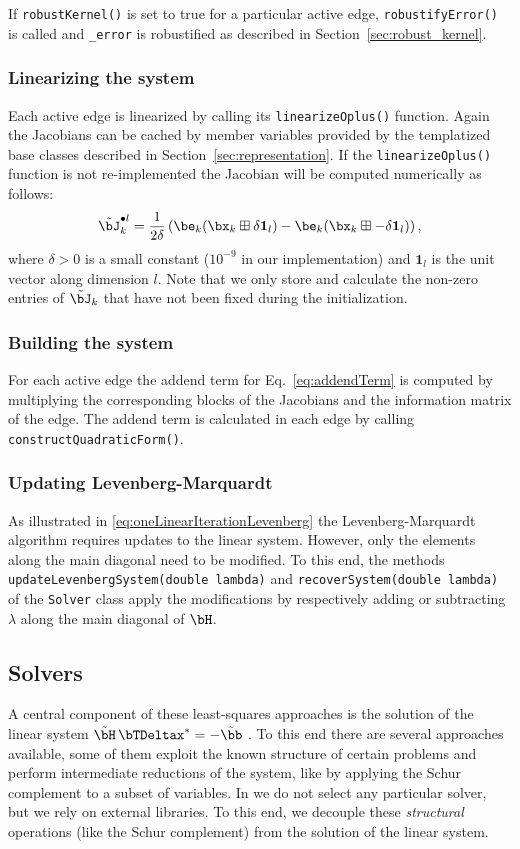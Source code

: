 \documentclass[a4paper]{article}
\begin{document}
 If \verb+robustKernel()+ is set to true for a particular active edge,
\verb+robustifyError()+ is called and \verb+_error+ is robustified 
as described in Section~\ref{sec:robust_kernel}.

\subsubsection{Linearizing the system}
Each active edge is linearized by calling its
\verb+linearizeOplus()+ function. Again the Jacobians can be cached by
member variables provided by the templatized base classes described in 
Section~\ref{sec:representation}. If the \verb+linearizeOplus()+
function is not re-implemented the Jacobian will be computed
numerically as follows:
\begin{eqnarray}
  \tilde \bJ_k^{\bullet l} = \frac{1}{2\delta} \left(
  \be_k (\bx_k \boxplus \delta\mathbf{1}_l)
  -
  \be_k (\bx_k \boxplus -\delta\mathbf{1}_l)
  \right),
  \label{eqn:jacobiannumeric}
\end{eqnarray}
where $\delta > 0$ is a small constant ($10^{-9}$ in our
implementation) and $\mathbf{1}_l$ is the unit vector along dimension
$l$. Note that we only store and calculate the non-zero entries of
$\tilde \bJ_k$ that have not been fixed during the initialization.

\subsubsection{Building the system}
For each active edge the addend term for Eq.~\ref{eq:addendTerm} is
computed by multiplying the corresponding blocks of the Jacobians and
the information matrix of the edge. The addend term is calculated in
each edge by calling \verb+constructQuadraticForm()+.

\subsubsection{Updating Levenberg-Marquardt}
As illustrated in \eqref{eq:oneLinearIterationLevenberg} the
Levenberg-Marquardt algorithm requires updates to the linear system.
However, only the elements along the main diagonal need to be modified.
To this end, the methods \verb+updateLevenbergSystem(double lambda)+ and
\verb+recoverSystem(double lambda)+ of the \verb+Solver+ class apply the
modifications by respectively adding or subtracting $\lambda$ along the
main diagonal of $\bH$.

\subsection{Solvers}
A central component of these least-squares approaches is the solution
of the linear system $\tilde \bH \, \bTDeltax^* = - \tilde \bb$ . To
this end there are several approaches available, some of them exploit
the known structure of certain problems and perform intermediate
reductions of the system, like by applying the Schur complement to a
subset of variables.  In \gopt{} we do not select any particular solver,
but we rely on external libraries.  To this end, we decouple these
\emph{structural} operations (like the Schur complement)
from the solution of the linear system.
\end{document}
